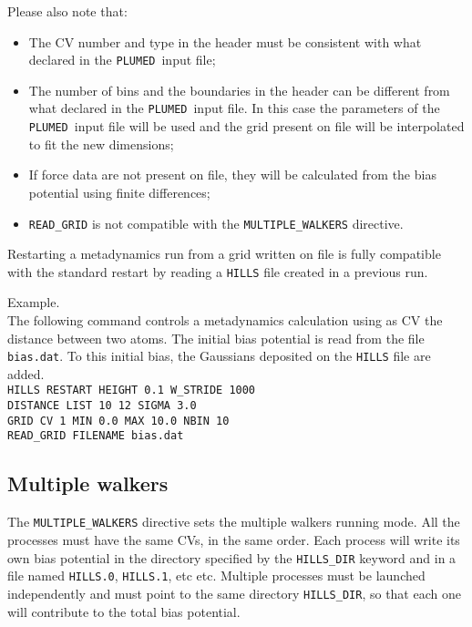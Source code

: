 \documentclass[12pt,fleqn]{report}
\newcommand{\plumed}{{\tt PLUMED}}
\newcommand{\esempio}[1]{
\vspace{10pt}
\begin{flushright}
\colorbox{light-gray}{
   \begin{minipage}{13cm}
       \scriptsize{
{\fontfamily{phv} \fontseries{b}
 \selectfont Example. \\
 \fontseries{m} \selectfont #1 } }
\end{minipage}}
\end{flushright}
\vspace{20pt}
}
\begin{document}
Please also note that:
\begin{itemize}
\item The CV number and type in the header must be consistent
with what declared in the \plumed \ input file;
\item The number of bins and the boundaries in the header
can be different from what declared in the \plumed \ input file.
In this case the parameters of the  \plumed \ input file will
be used and the grid present on file will be interpolated to fit
the new dimensions; 
\item If force data are not present on file, they will be
calculated from the bias potential using finite differences;
\item {\tt READ\_GRID} is not compatible with the {\tt MULTIPLE\_WALKERS} directive.  
\end{itemize}

Restarting a metadynamics run from a grid written on file
is fully compatible with the standard restart by reading a
{\tt HILLS} file created in a previous run.  

\esempio{The following command controls a metadynamics calculation using as CV the distance
between two atoms. The initial bias potential is read from the file {\tt bias.dat}. 
To this initial bias, the Gaussians deposited on the {\tt HILLS} file are added. \vspace{10pt} \\
{ \tt HILLS RESTART HEIGHT 0.1 W\_STRIDE 1000 \\
  DISTANCE LIST 10 12 SIGMA 3.0 \\
  GRID CV 1 MIN 0.0 MAX 10.0 NBIN 10 \\
  READ\_GRID FILENAME bias.dat}}

\subsection{Multiple walkers}
\label{ssc.multiplewalkers}
The {\tt MULTIPLE\_WALKERS} directive sets the multiple walkers \cite{multiplewalkers} running mode. 
All the processes must have the same CVs, in the same order.
Each process will write its own bias potential in the
directory specified by the {\tt HILLS\_DIR} keyword and in a file
named {\tt HILLS.0}, {\tt HILLS.1}, etc etc. Multiple processes must be
launched independently and must point to the same directory {\tt HILLS\_DIR}, so that each one will
contribute to the total bias potential.
\end{document}
